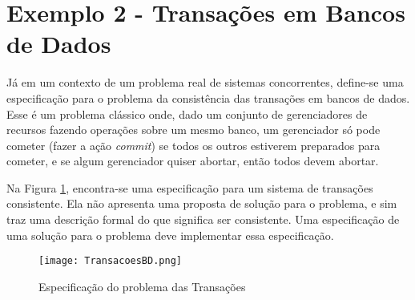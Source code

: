 \section{Exemplo 2 - Transações em Bancos de Dados}

Já em um contexto de um problema real de sistemas concorrentes, define-se uma especificação para o problema da consistência das transações em bancos de dados. Esse é um problema clássico onde, dado um conjunto de gerenciadores de recursos fazendo operações sobre um mesmo banco, um gerenciador só pode cometer (fazer a ação \textit{commit}) se todos os outros estiverem preparados para cometer, e se algum gerenciador quiser abortar, então todos devem abortar.

Na Figura \ref{fig:ex2tla}, encontra-se uma especificação para um sistema de transações consistente. Ela não apresenta uma proposta de solução para o problema, e sim traz uma descrição formal do que significa ser consistente. Uma especificação de uma solução para o problema deve implementar essa especificação.



\begin{figure}
  \centering
  \texttt{[image: TransacoesBD.png]}
  \caption{Especificação do problema das Transações}
\label{fig:ex2tla}
\end{figure}
